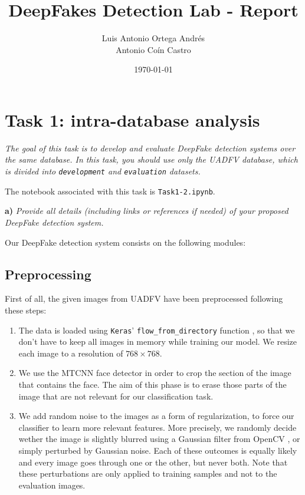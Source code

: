 \documentclass[11pt]{article}
\author{Luis Antonio Ortega Andrés\\Antonio Coín Castro}
\date{\today}
\title{DeepFakes Detection Lab - Report}
\begin{document}
\maketitle

\section*{Task 1: intra-database analysis}

\textit{The goal of this task is to develop and evaluate DeepFake detection systems over the same database. In this task, you should use only the UADFV database, which is divided into \texttt{development} and \texttt{evaluation} datasets.}

The notebook associated with this task is \texttt{Task1-2.ipynb}.

\textbf{a)} \textit{Provide all details (including links or references if needed) of your proposed DeepFake detection system.}

Our DeepFake detection system consists on the following modules:
\subsection*{Preprocessing}

First of all, the given images from UADFV have been preprocessed following these steps:
\begin{enumerate}
  \item The data is loaded using \texttt{Keras}' \texttt{flow\_from\_directory} function \citep{chollet2015keras}, so that we don't have to keep all images in memory while training our model. We resize each image to a resolution of $768\times 768$.
  \item We use the MTCNN face detector \citep{zhang2016joint} in order to crop the section of the image that contains the face. The aim of this phase is to erase those parts of the image that are not relevant for our classification task.
  \item We add random noise to the images as a form of regularization, to force our classifier to learn more relevant features. More precisely, we randomly decide wether the image is slightly blurred using a Gaussian filter from OpenCV \citep{opencv_library}, or simply perturbed by Gaussian noise. Each of these outcomes is equally likely and every image goes through one or the other, but never both. Note that these perturbations are only applied to training samples and not to the evaluation images.
\end{enumerate}
\end{document}
